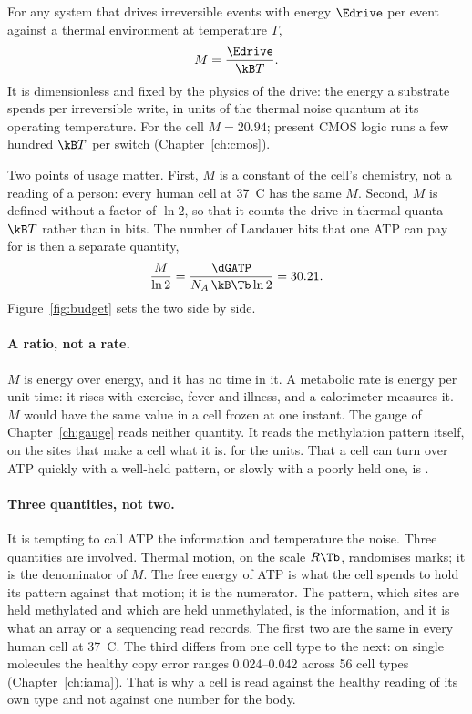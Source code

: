 \begin{definition}
For any system that drives irreversible events with energy $\Edrive$ per event against a thermal
environment at temperature $T$,
\[
  M=\frac{\Edrive}{\kB T}.
\]
It is dimensionless and fixed by the physics of the drive: the energy a substrate spends per irreversible write, in units of the thermal noise
quantum at its operating temperature. For the cell $M=20.94$; present CMOS logic runs a few hundred $\kB T$ per switch
(Chapter~\ref{ch:cmos}).
\end{definition}

Two points of usage matter. First, $M$ is a constant of the cell's chemistry, not a reading of a
person: every human cell at 37~\textdegree C has the same $M$. Second, $M$ is defined without a
factor of $\ln2$, so that it counts the drive in thermal quanta $\kB T$ rather than in bits. The number of Landauer bits that one ATP can
pay for is then a separate quantity,
\begin{equation}
  \frac{M}{\ln2}=\frac{\dGATP}{N_A\,\kB\Tb\ln2}=30.21 .
  \label{eq:bitsperATP}
\end{equation}
\calc{} Figure~\ref{fig:budget} sets the two side by side.

\paragraph{A ratio, not a rate.} $M$ is energy over energy, and it has no time in it. A metabolic rate is energy per unit time: it
rises with exercise, fever and illness, and a calorimeter measures it. $M$ would have the same value in a cell frozen at one instant.
The gauge of Chapter~\ref{ch:gauge} reads neither quantity. It reads the methylation pattern itself, on the sites that make a cell
what it is. \derived{} for the units. That a cell can turn over ATP quickly with a well-held pattern, or slowly with a poorly held
one, is \interp.

\paragraph{Three quantities, not two.} It is tempting to call ATP the information and temperature the noise. Three quantities are
involved. Thermal motion, on the scale $R\Tb$, randomises marks; it is the denominator of $M$. The free energy of ATP is what the
cell spends to hold its pattern against that motion; it is the numerator. The pattern, which sites are held methylated and which are
held unmethylated, is the information, and it is what an array or a sequencing read records. The first two are the same in every
human cell at 37~\textdegree C. \derived{} The third differs from one cell type to the next: on single molecules the healthy copy
error ranges 0.024--0.042 across 56 cell types (Chapter~\ref{ch:iama}). \measured{} That is why a cell is read against the healthy
reading of its own type and not against one number for the body.

